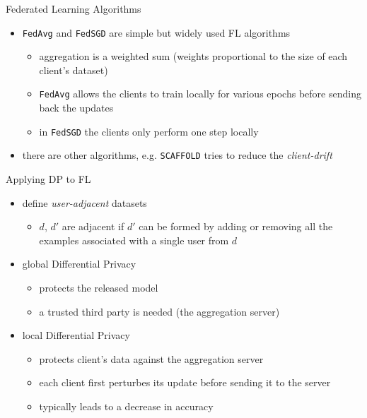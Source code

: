 \documentclass[aspectratio=169]{beamer}
\begin{document}
\begin{frame}{Federated Learning Algorithms}
    \begin{itemize}
        \item \texttt{FedAvg} and \texttt{FedSGD} are simple but widely used FL algorithms
        \begin{itemize}
            \item aggregation is a weighted sum (weights proportional to the size of each client's dataset)
            \item \texttt{FedAvg} allows the clients to train locally for various epochs before sending back the updates
            \item in \texttt{FedSGD} the clients only perform one step locally 
        \end{itemize}
        \item<2-> there are other algorithms, e.g. \texttt{SCAFFOLD} tries to reduce the \textit{client-drift}
    \end{itemize}
\end{frame}

\begin{frame}{Applying DP to FL}
    \begin{itemize}
        \item \textcite{mcmahan:2018} define \textit{user-adjacent} datasets
        \begin{itemize}
            \item $d$, $d'$ are adjacent if $d'$ can be formed by adding or removing all the examples associated with a single user from $d$
        \end{itemize}
        \item<2-> global Differential Privacy
        \begin{itemize}
            \item protects the released model
            \item a trusted third party is needed (the aggregation server)
        \end{itemize}
        \item<3-> local Differential Privacy
        \begin{itemize}
            \item protects client's data against the aggregation server
            \item each client first perturbes its update before sending it to the server
            \item typically leads to a decrease in accuracy
        \end{itemize}
    \end{itemize}
\end{frame}
\end{document}
